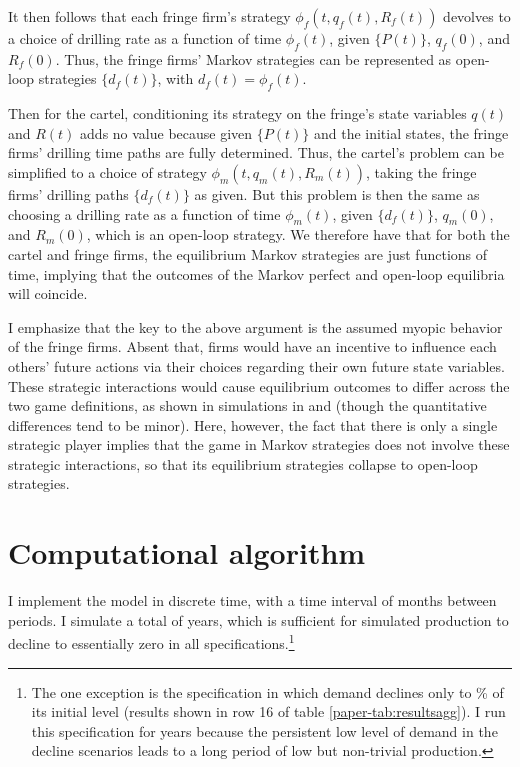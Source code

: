 \documentclass[12pt]{article}
\begin{document}
It then follows that each fringe firm's strategy $\phi_f(t,q_f(t),R_f(t))$ devolves to a choice of drilling rate as a function of time $\phi_f(t)$, given $\{P(t)\}$, $q_f(0)$, and $R_f(0)$. Thus, the fringe firms' Markov strategies can be represented as open-loop strategies $\{d_f(t)\}$, with $d_f(t)=\phi_f(t)$.

Then for the cartel, conditioning its strategy on the fringe's state variables $q(t)$ and $R(t)$ adds no value because given $\{P(t)\}$ and the initial states, the fringe firms' drilling time paths are fully determined. Thus, the cartel's problem can be simplified to a choice of strategy $\phi_m(t,q_m(t),R_m(t))$, taking the fringe firms' drilling paths $\{d_f(t)\}$ as given. But this problem is then the same as choosing a drilling rate as a function of time $\phi_m(t)$, given $\{d_f(t)\}$, $q_m(0)$, and $R_m(0)$, which is an open-loop strategy. We therefore have that for both the cartel and fringe firms, the equilibrium Markov strategies are just functions of time, implying that the outcomes of the Markov perfect and open-loop equilibria will coincide.

I emphasize that the key to the above argument is the assumed myopic behavior of the fringe firms. Absent that, firms would have an incentive to influence each others' future actions via their choices regarding their own future state variables. These strategic interactions would cause equilibrium outcomes to differ across the two game definitions, as shown in simulations in \cite{eswaranlewis1985} and \cite{benchekrounwithagen2012} (though the quantitative differences tend to be minor). Here, however, the fact that there is only a single strategic player implies that the game in Markov strategies does not involve these strategic interactions, so that its equilibrium strategies collapse to open-loop strategies.

\newpage


\section{Computational algorithm} \label{sec:comp}

I implement the model in discrete time, with a time interval of months between periods. I simulate a total of years, which is sufficient for simulated production to decline to essentially zero in all specifications.\footnote{The one exception is the specification in which demand declines only to \unskip\% of its initial level (results shown in row 16 of table \ref{paper-tab:resultsagg}). I run this specification for years because the persistent low level of demand in the decline scenarios leads to a long period of low but non-trivial production.}
\end{document}
